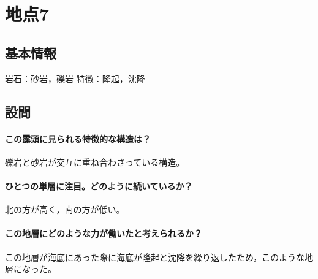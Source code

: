 \documentclass[uplatex,b5paper]{jsreport}
\begin{document}
  \section{地点7}
    \subsection{基本情報}
    岩石：砂岩，礫岩
    特徴：隆起，沈降
    \subsection{設問}
      \paragraph{この露頭に見られる特徴的な構造は？}
      礫岩と砂岩が交互に重ね合わさっている構造。
      \paragraph{ひとつの単層に注目。どのように続いているか？}
      北の方が高く，南の方が低い。
      \paragraph{この地層にどのような力が働いたと考えられるか？}
      この地層が海底にあった際に海底が隆起と沈降を繰り返したため，このような地層になった。
\end{document}
